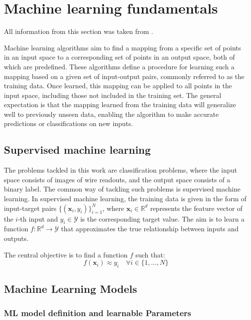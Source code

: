 \documentclass{pracalicmgr}
\begin{document}
\chapter{Machine learning fundamentals}

All information from this section was taken from \cite{MlBasics}.

Machine learning algorithms aim to find a mapping from a specific set of points in an input space to a corresponding set of points in an output space, both of which are predefined. These algorithms define a procedure for learning such a mapping based on a given set of input-output pairs, commonly referred to as the training data. Once learned, this mapping can be applied to all points in the input space, including those not included in the training set. The general expectation is that the mapping learned from the training data will generalize well to previously unseen data, enabling the algorithm to make accurate predictions or classifications on new inputs.

\section{Supervised machine learning}

The problems tackled in this work are classification problems, where the input space consists of images of wire readouts, and the output space consists of a binary label. The common way of tackling such problems is supervised machine learning.
In supervised machine learning, the training data is given in the form of input-target pairs \( \{(\mathbf{x}_i, y_i)\}_{i=1}^N \), where \( \mathbf{x}_i \in \mathbb{R}^d \) represents the feature vector of the \( i \)-th input and \( y_i \in \mathcal{Y} \) is the corresponding target value. The aim is to learn a function \( f: \mathbb{R}^d \rightarrow \mathcal{Y} \) that approximates the true relationship between inputs and outputs.

The central objective is to find a function \( f \) such that:
\[
f(\mathbf{x}_i) \approx y_i \quad \forall i \in \{1, \dots, N\}
\]

\section{Machine Learning Models}

\subsection{ML model definition and learnable Parameters}
\end{document}
